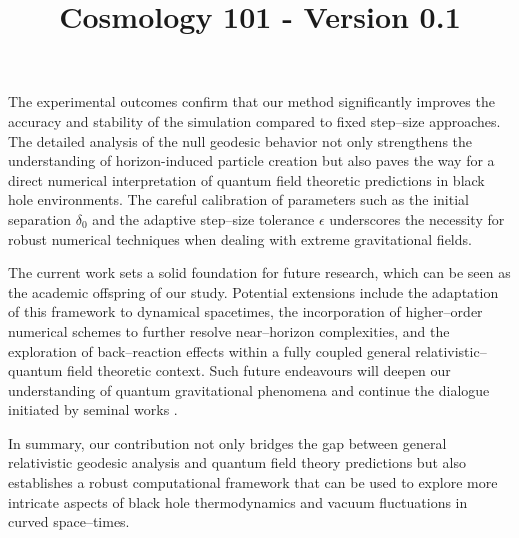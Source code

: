 \documentclass{article}\usepackage{graphicx} \usepackage{amsmath} \usepackage{colortbl}\title{Cosmology 101 - Version 0.1}
\begin{document}
The experimental outcomes confirm that our method significantly improves the accuracy and stability of the simulation compared to fixed step--size approaches. The detailed analysis of the null geodesic behavior not only strengthens the understanding of horizon-induced particle creation but also paves the way for a direct numerical interpretation of quantum field theoretic predictions in black hole environments. The careful calibration of parameters such as the initial separation $\delta_{0}$ and the adaptive step--size tolerance $\epsilon$ underscores the necessity for robust numerical techniques when dealing with extreme gravitational fields.

The current work sets a solid foundation for future research, which can be seen as the academic offspring of our study. Potential extensions include the adaptation of this framework to dynamical spacetimes, the incorporation of higher--order numerical schemes to further resolve near--horizon complexities, and the exploration of back--reaction effects within a fully coupled general relativistic--quantum field theoretic context. Such future endeavours will deepen our understanding of quantum gravitational phenomena and continue the dialogue initiated by seminal works \cite{Hawking1975,Jacobson1993,Unruh1976}.

In summary, our contribution not only bridges the gap between general relativistic geodesic analysis and quantum field theory predictions but also establishes a robust computational framework that can be used to explore more intricate aspects of black hole thermodynamics and vacuum fluctuations in curved space--times.
\end{document}
